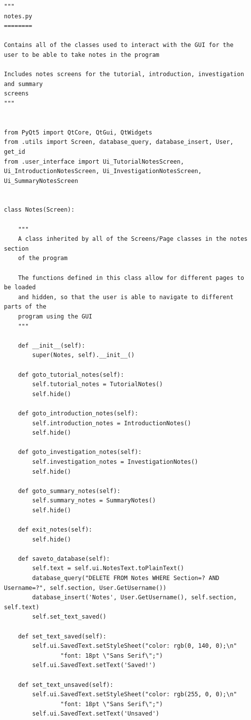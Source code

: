\documentclass{article}
\begin{document}
\begin{lstlisting}
"""
notes.py
========

Contains all of the classes used to interact with the GUI for the
user to be able to take notes in the program

Includes notes screens for the tutorial, introduction, investigation and summary
screens
"""


from PyQt5 import QtCore, QtGui, QtWidgets
from .utils import Screen, database_query, database_insert, User, get_id
from .user_interface import Ui_TutorialNotesScreen, Ui_IntroductionNotesScreen, Ui_InvestigationNotesScreen, Ui_SummaryNotesScreen


class Notes(Screen):

    """
    A class inherited by all of the Screens/Page classes in the notes section
    of the program

    The functions defined in this class allow for different pages to be loaded
    and hidden, so that the user is able to navigate to different parts of the
    program using the GUI
    """

    def __init__(self):
        super(Notes, self).__init__()

    def goto_tutorial_notes(self):
        self.tutorial_notes = TutorialNotes()
        self.hide()

    def goto_introduction_notes(self):
        self.introduction_notes = IntroductionNotes()
        self.hide()

    def goto_investigation_notes(self):
        self.investigation_notes = InvestigationNotes()
        self.hide()

    def goto_summary_notes(self):
        self.summary_notes = SummaryNotes()
        self.hide()

    def exit_notes(self):
        self.hide()

    def saveto_database(self):
        self.text = self.ui.NotesText.toPlainText()
        database_query("DELETE FROM Notes WHERE Section=? AND Username=?", self.section, User.GetUsername())
        database_insert('Notes', User.GetUsername(), self.section, self.text)
        self.set_text_saved()

    def set_text_saved(self):
        self.ui.SavedText.setStyleSheet("color: rgb(0, 140, 0);\n"
                "font: 18pt \"Sans Serif\";")
        self.ui.SavedText.setText('Saved!')

    def set_text_unsaved(self):
        self.ui.SavedText.setStyleSheet("color: rgb(255, 0, 0);\n"
                "font: 18pt \"Sans Serif\";")
        self.ui.SavedText.setText('Unsaved')


\end{lstlisting}
\end{document}
